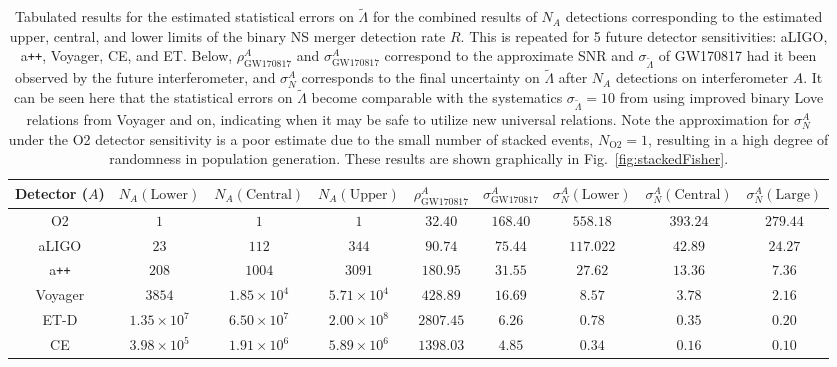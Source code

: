 \documentclass[prd,twocolumn,nofootinbib,superscriptaddress,amsmath,amssymb]{revtex4-1}
\begin{document}
\begin{table*}[ht!]
\centering
\caption{
Tabulated results for the estimated statistical errors on $\tilde{\Lambda}$ for the combined results of $N_A$ detections corresponding to the estimated upper, central, and lower limits of the binary NS merger detection rate $R$.
This is repeated for 5 future detector sensitivities: aLIGO, a\texttt{++}, Voyager, CE, and ET.
Below, $\rho^A_{\text{GW170817}}$ and $\sigma^A_{\text{GW170817}}$ correspond to the approximate SNR and $\sigma_{\tilde{\Lambda}}$ of GW170817 had it been observed by the future interferometer, and $\sigma^A_N$ corresponds to the final uncertainty on $\tilde{\Lambda}$ after $N_A$ detections on interferometer $A$.
It can be seen here that the statistical errors on $\tilde{\Lambda}$ become comparable with the systematics $\sigma_{\tilde{\Lambda}}=10$ from using improved binary Love relations from Voyager and on, indicating when it may be safe to utilize new universal relations.
Note the approximation for $\sigma^A_N$ under the O2 detector sensitivity is a poor estimate due to the small number of stacked events, $N_{\text{O2}}=1$, resulting in a high degree of randomness in population generation.
These results are shown graphically in Fig.~\ref{fig:stackedFisher}.
}\label{tab:variances}
\begin{tabular}{ c || c c c c c c c c} 
\hline
Detector ($A$) & $N_A (\text{Lower})$ & $N_A (\text{Central})$ & $N_A (\text{Upper})$ & $\rho^A_{\text{GW170817}}$ & $\sigma^A_{\text{GW170817}}$ & $\sigma^A_N (\text{Lower})$ & $\sigma^A_N (\text{Central})$ & $\sigma^A_N (\text{Large})$\\
\hline
\hline
O2 & $1$ & $1$ & $1$ & $32.40$ & $168.40$ & $558.18$ & $393.24$ & $279.44$\\
aLIGO & $23$ & $112$ & $344$ & $90.74$ & $75.44$ & $117.022$ & $42.89$ & $24.27$\\
a\texttt{++} & $208$ & $1004$ & $3091$ & $180.95$ & $31.55$ & $27.62$ & $13.36$ & $7.36$\\
Voyager & $3854$ & $1.85 \times 10^4$ & $5.71 \times 10^4$ & $428.89$ & $16.69$ & $8.57$ & $3.78$ & $2.16$\\
ET-D & $1.35\times 10^7$ & $6.50\times 10^7$ & $2.00\times 10^8$ & $2807.45$ & $6.26$ & $0.78$ & $0.35$ & $0.20$\\
CE & $3.98\times 10^5$ & $1.91\times 10^6$ & $5.89\times 10^6$ & $1398.03$ & $4.85$ & $0.34$ & $0.16$ & $0.10$\\
\hline
\end{tabular}
\end{table*}
\end{document}
